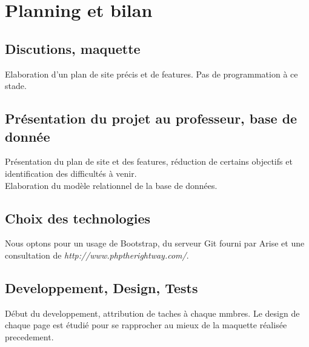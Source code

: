 \documentclass[11pt]{article} %
\begin{document}
\section {Planning et bilan}
	
\subsection{Discutions, maquette}
Elaboration d'un plan de site précis et de features. Pas de programmation à ce stade.

\subsection{Présentation du projet au professeur, base de donnée}
Présentation du plan de site et des features, réduction de certains objectifs et identification des difficultés à venir.\\
Elaboration du modèle relationnel de la base de données.

\subsection{Choix des technologies}
Nous optons pour un usage de Bootstrap, du serveur Git fourni par Arise et une consultation de \emph{http://www.phptherightway.com/}.


\subsection{Developpement, Design, Tests}
Début du developpement, attribution de taches à chaque mmbres. Le design de chaque page est étudié pour se rapprocher au mieux de la maquette réalisée precedement.
\end{document}
